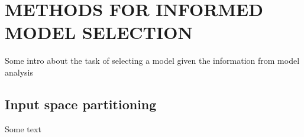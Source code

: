 \chapter{METHODS FOR INFORMED MODEL SELECTION\label{chapter:selection}}

Some intro about the task of selecting a model given the information from model analysis







\section{Input space partitioning\label{sec:input_partition}}

Some text
